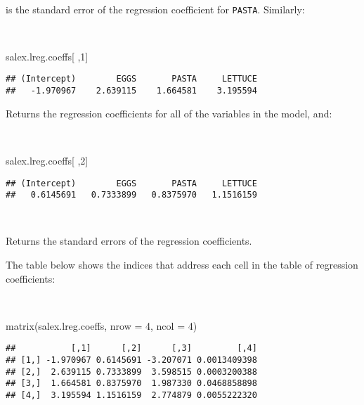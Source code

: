 \documentclass[
  12pt,
  a4paper]{book}
\newenvironment{Shaded}{\begin{snugshade}}{\end{snugshade}}
\newcommand{\AttributeTok}[1]{\textcolor[rgb]{0.77,0.63,0.00}{#1}}
\newcommand{\DecValTok}[1]{\textcolor[rgb]{0.00,0.00,0.81}{#1}}
\newcommand{\FunctionTok}[1]{\textcolor[rgb]{0.00,0.00,0.00}{#1}}
\newcommand{\NormalTok}[1]{#1}
\begin{document}
~

is the standard error of the regression coefficient for \texttt{PASTA}. Similarly:

~

\begin{Shaded}
\begin{Highlighting}[]
\NormalTok{salex.lreg.coeffs[ ,}\DecValTok{1}\NormalTok{]}
\end{Highlighting}
\end{Shaded}

\begin{verbatim}
## (Intercept)        EGGS       PASTA     LETTUCE 
##   -1.970967    2.639115    1.664581    3.195594
\end{verbatim}

\newpage

Returns the regression coefficients for all of the variables in the model, and:

~

\begin{Shaded}
\begin{Highlighting}[]
\NormalTok{salex.lreg.coeffs[ ,}\DecValTok{2}\NormalTok{]}
\end{Highlighting}
\end{Shaded}

\begin{verbatim}
## (Intercept)        EGGS       PASTA     LETTUCE 
##   0.6145691   0.7333899   0.8375970   1.1516159
\end{verbatim}

~

Returns the standard errors of the regression coefficients.

The table below shows the indices that address each cell in the table of regression coefficients:

~

\begin{Shaded}
\begin{Highlighting}[]
\FunctionTok{matrix}\NormalTok{(salex.lreg.coeffs, }\AttributeTok{nrow =} \DecValTok{4}\NormalTok{, }\AttributeTok{ncol =} \DecValTok{4}\NormalTok{)}
\end{Highlighting}
\end{Shaded}

\begin{verbatim}
##           [,1]      [,2]      [,3]         [,4]
## [1,] -1.970967 0.6145691 -3.207071 0.0013409398
## [2,]  2.639115 0.7333899  3.598515 0.0003200388
## [3,]  1.664581 0.8375970  1.987330 0.0468858898
## [4,]  3.195594 1.1516159  2.774879 0.0055222320
\end{verbatim}
\end{document}
